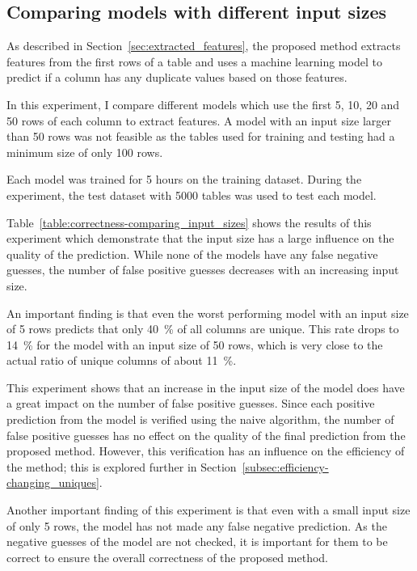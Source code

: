 \subsection{Comparing models with different input sizes}\label{subsec:correctness_comparing-input-size}
As described in Section~\ref{sec:extracted_features}, the proposed method extracts features from the first rows of a table and uses a machine learning model to predict if a column has any duplicate values based on those features.

In this experiment, I compare different models which use the first \num{5}, \num{10}, \num{20} and \num{50} rows of each column to extract features. A model with an input size larger than \num{50} rows was not feasible as the tables used for training and testing had a minimum size of only \num{100} rows.

Each model was trained for \num{5} hours on the training dataset. During the experiment, the test dataset with \num{5000} tables was used to test each model.

Table~\ref{table:correctness-comparing_input_sizes} shows the results of this experiment which demonstrate that the input size has a large influence on the quality of the prediction. While none of the models have any false negative guesses, the number of false positive guesses decreases with an increasing input size.

An important finding is that even the worst performing model with an input size of \num{5} rows predicts that only \SI{40}{\percent} of all columns are unique. This rate drops to \SI{14}{\percent} for the model with an input size of \num{50} rows, which is very close to the actual ratio of unique columns of about \SI{11}{\percent}.

This experiment shows that an increase in the input size of the model does have a great impact on the number of false positive guesses. Since each positive prediction from the model is verified using the naive algorithm, the number of false positive guesses has no effect on the quality of the final prediction from the proposed method. However, this verification has an influence on the efficiency of the method; this is explored further in Section~\ref{subsec:efficiency-changing_uniques}.

Another important finding of this experiment is that even with a small input size of only \num{5} rows, the model has not made any false negative prediction. As the negative guesses of the model are not checked, it is important for them to be correct to ensure the overall correctness of the proposed method.

